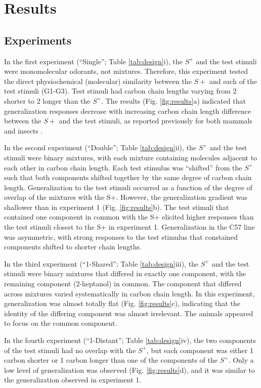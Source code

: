 \section*{Results}
\label{results}
\subsection*{Experiments}
\label{results_experiments}
In the first experiment (``Single''; Table \ref{tab:design}i), the $S^+$ and the test stimuli were monomolecular odorants, not mixtures. Therefore, this experiment tested the direct physiochemical (molecular) similarity between the $S+$ and each of the test stimuli (G1-G3). Test stimuli had carbon chain lengths varying from 2 shorter to 2 longer than the $S^+$.  
The results (Fig. \ref{fig:results}a) indicated that generalization responses decrease with increasing carbon chain length difference between the $S+$ and the test stimuli, as reported previously for both mammals and insects \cite{18810459}\cite{24488965}.  

In the second experiment (``Double''; Table \ref{tab:design}ii), the $S^+$ and the test stimuli were binary mixtures, with each mixture containing molecules adjacent to each other in carbon chain length.  
Each test stimulus was ``shifted'' from the $S^+$ such that both components shifted together by the same degree of carbon chain length.  
Generalization to the test stimuli occurred as a function of the degree of overlap of the mixtures with the S+. However, the generalization gradient was shallower than in experiment 1 (Fig. \ref{fig:results}b). The test stimuli that contained one component in common with the S+ elicited higher responses than the test stimuli closest to the S+ in experiment 1. Generalization in the C57 line was asymmetric, with strong responses to the test stimulus that constained components shifted to shorter chain lengths. 

In the third experiment (``1-Shared''; Table \ref{tab:design}iii), the $S^+$ and the test stimuli were binary mixtures that differed in exactly one component, with the remaining component (2-heptanol) in common.  
The component that differed across mixtures varied systematically in carbon chain length.  
In this experiment, generalization was almost totally flat (Fig. \ref{fig:results}c), indicating that the identity of the differing component was almost irrelevant.  
The animals appeared to focus on the common component.  

In the fourth experiment (``1-Distant''; Table \ref{tab:design}iv), the two components of the test stimuli had no overlap with the $S^+$, but each component was either 1 carbon shorter or 1 carbon longer than one of the components of the $S^+$.  
Only a low level of generalization was observed (Fig. \ref{fig:results}d), and it was similar to the generalization observed in experiment 1.  

